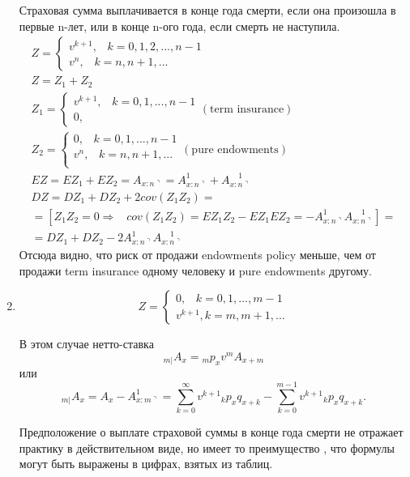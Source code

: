 \begin{enumerate}
	Страховая сумма выплачивается в конце года смерти, если она произошла в первые n-лет, или в конце n-ого года, если смерть не наступила.
	\begin{gather*}
		Z= \begin{cases}
			v^{k+1}, \;\;\; k = 0, 1, 2, ..., n-1\\
			v^n, \;\;\; k = n, n+1,...
		\end{cases}\\
		Z = Z_1 + Z_2\\
		Z_1 = \begin{cases}
			v^{k+1}, \;\;\;k = 0, 1, ..., n-1\\
			0, \;\;\;
		\end{cases}(\text{term insurance})\\
		Z_2 = \begin{cases}
			0, \;\;\; k = 0, 1, ..., n-1\\
			v^n, \;\;\; k = n, n+1, ...\\
		\end{cases}(\text{pure endowments})\\
		EZ = EZ_1 + EZ_2 = A_{x:n\urcorner} = A_{x:n\urcorner}^{1}+ A_{x:n\urcorner}^{\;\;\;\;1}\\
		DZ = DZ_1 + DZ_2 + 2cov(Z_1Z_2) = \\
		=[Z_1Z_2 = 0 \Rightarrow \;\;\; cov(Z_1Z_2) = EZ_1Z_2 - EZ_1EZ_2 = -A_{x:n\urcorner}^{1}A_{x:n\urcorner}^{\;\;\;\;1}]=\\
		=DZ_1+DZ_2 -2 A_{x:n\urcorner}^{1}A_{x:n\urcorner}^{\;\;\;\;1}
	\end{gather*}
	Отсюда видно, что риск от продажи endowments policy меньше, чем от продажи term insurance одному человеку и pure endowments другому.
	
	\item {}

	\[
		Z = \begin{cases}
			0, \;\;\; k = 0, 1, ..., m-1\\
			v^{k+1}, k = m, m+1, ...
		\end{cases}
	\]

	В этом случае нетто-ставка
	\[ {}_{m|}A_x = {}_mp_xv^mA_{x+m} \]
	или
	\[ {}_{m|}A_x = A_x - A_{x:m\urcorner}^{1} = \sum\limits_{k=0}^{\infty}v^{k+1}{}_kp_xq_{x+k} - \sum\limits_{k=0}^{m-1}v^{k+1}{}_kp_xq_{x+k} .\]

	\begin{remark}
		Предположение о выплате страховой суммы в конце года смерти не отражает практику в действительном виде, но имеет то преимущество , что формулы могут быть выражены в цифрах, взятых из таблиц.
	\end{remark}


\end{enumerate}
